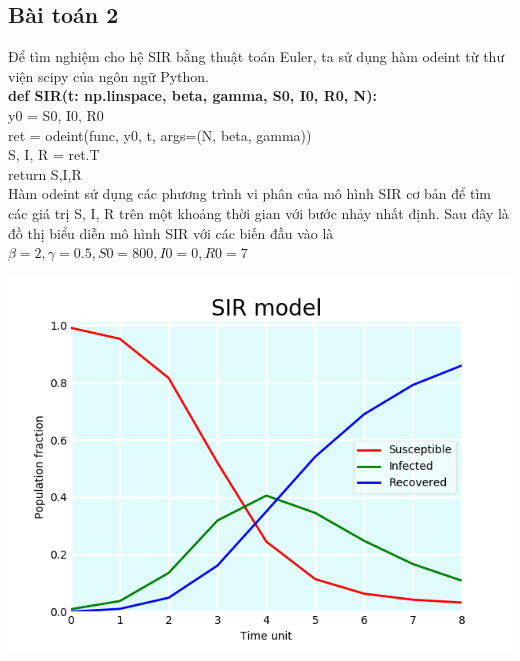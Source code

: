\documentclass[a4paper]{article}
\begin{document}
\subsection{Bài toán 2}  
Để tìm nghiệm cho hệ SIR bằng thuật toán Euler, ta sử dụng hàm odeint từ thư viện scipy của ngôn ngữ Python.\\
 \textbf{\quad def  SIR(t: np.linspace, beta, gamma, S0, I0, R0, N): \\}
\null \qquad \qquad y0 = S0, I0, R0 \\ 
\null \qquad \qquad ret = odeint(func, y0, t, args=(N, beta, gamma)) \\ 
\null \qquad \qquad S, I, R = ret.T \\ 
\null \qquad \qquad return S,I,R \\
Hàm odeint sử dụng các phương trình vi phân của mô hình SIR cơ bản để tìm các giá trị S, I, R trên một khoảng thời gian với bước nhảy nhất định.
Sau đây là đồ thị biểu diễn mô hình SIR với các biến đầu vào là $\beta=2, \gamma=0.5, S0=800, I0=0, R0=7$
\begin{center}
\includegraphics[scale=0.8]{Images/Figure_1.png}
\end{center}
\end{document}
